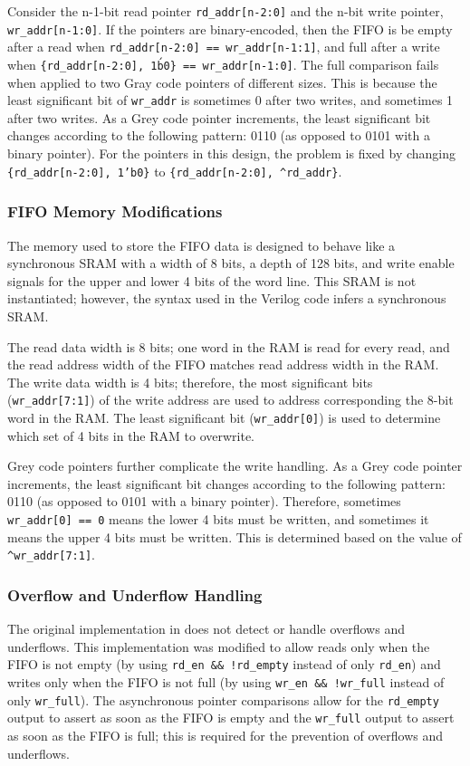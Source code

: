 Consider the n-1-bit read pointer \texttt{rd\_addr[n-2:0]} and the n-bit write pointer, \texttt{wr\_addr[n-1:0]}. If the pointers are binary-encoded, then the FIFO is be empty after a read when \texttt{rd\_addr[n-2:0] == wr\_addr[n-1:1]}, and full after a write when \texttt{\{rd\_addr[n-2:0], 1\'b0\} == wr\_addr[n-1:0]}. The full comparison fails when applied to two Gray code pointers of different sizes. This is because the least significant bit of \texttt{wr\_addr} is sometimes 0 after two writes, and sometimes 1 after two writes. As a Grey code pointer increments, the least significant bit changes according to the following pattern: 0110 (as opposed to 0101 with a binary pointer). For the pointers in this design, the problem is fixed by changing \texttt{\{rd\_addr[n-2:0], 1'b0\}} to \texttt{\{rd\_addr[n-2:0], \textasciicircum rd\_addr\}}.

\subsubsection{FIFO Memory Modifications}
The memory used to store the FIFO data is designed to behave like a synchronous SRAM with a width of 8 bits, a depth of 128 bits, and write enable signals for the upper and lower 4 bits of the word line. This SRAM is not instantiated; however, the syntax used in the Verilog code infers a synchronous SRAM.

The read data width is 8 bits; one word in the RAM is read for every read, and the read address width of the FIFO matches read address width in the RAM. The write data width is 4 bits; therefore, the most significant bits (\texttt{wr\_addr[7:1]}) of the write address are used to address corresponding the 8-bit word in the RAM. The least significant bit (\texttt{wr\_addr[0]}) is used to determine which set of 4 bits in the RAM to overwrite.

Grey code pointers further complicate the write handling. As a Grey code pointer increments, the least significant bit changes according to the following pattern: 0110 (as opposed to 0101 with a binary pointer). Therefore, sometimes \texttt{wr\_addr[0] == 0} means the lower 4 bits must be written, and sometimes it means the upper 4 bits must be written. This is determined based on the value of \texttt{\textasciicircum wr\_addr[7:1]}.

\subsubsection{Overflow and Underflow Handling}
The original implementation in \cite{async-fifo} does not detect or handle overflows and underflows. This implementation was modified to allow reads only when the FIFO is not empty (by using \texttt{rd\_en \&\& !rd\_empty} instead of only \texttt{rd\_en}) and writes only when the FIFO is not full (by using \texttt{wr\_en \&\& !wr\_full} instead of only \texttt{wr\_full}). The asynchronous pointer comparisons allow for the \texttt{rd\_empty} output to assert as soon as the FIFO is empty and the \texttt{wr\_full} output to assert as soon as the FIFO is full; this is required for the prevention of overflows and underflows.


